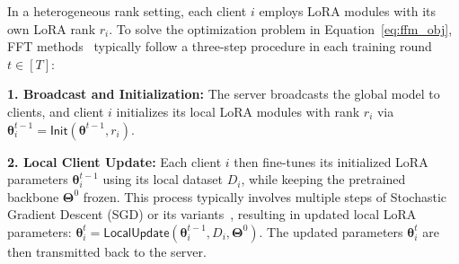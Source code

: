 \documentclass{article} %
\newcommand{\Init}{\mathsf{Init}}
\newcommand{\LocalUpdate}{\mathsf{LocalUpdate}}
\begin{document}

In a heterogeneous rank setting, each client $i$ employs LoRA modules with its own LoRA rank $r_i$. To solve the optimization problem in Equation~\eqref{eq:ffm_obj}, FFT methods~\cite{cho2024heterogeneous,wangflora,bai2024federated} typically follow a three-step procedure in each training round $t\in[T]$:



\textbf{1. Broadcast and Initialization:}
    The server broadcasts the global model to clients, and client $i$ initializes its local LoRA modules with rank $r_i$ via $\boldsymbol{\theta}_i^{t-1} = \Init\!\left(\boldsymbol{\theta}^{t-1}, r_i\right)$. 

\textbf{2. Local Client Update:}
    Each client $i$ then fine-tunes its initialized LoRA parameters $\boldsymbol{\theta}_i^{t-1}$ using its local dataset $D_i$, while keeping the pretrained backbone $\boldsymbol{\Theta}^0$ frozen. This process typically involves multiple steps of Stochastic Gradient Descent (SGD) or its variants~\cite{kingma2014adam}, resulting in updated local LoRA parameters: $\boldsymbol{\theta}_i^t = \LocalUpdate\!\left(\boldsymbol{\theta}_i^{t-1}, D_i, \boldsymbol{\Theta}^0\right).$
    The updated parameters $\boldsymbol{\theta}_i^t$ are then transmitted back to the server. 
\end{document}
